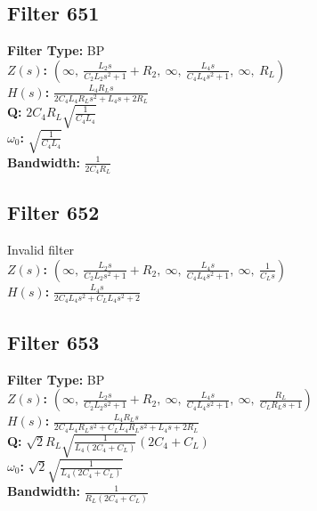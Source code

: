 \documentclass{article}
\begin{document}
\subsection*{Filter 651}
\textbf{Filter Type:} BP \\ 
\textbf{$Z(s)$:} $\left( \infty, \  \frac{L_{2} s}{C_{2} L_{2} s^{2} + 1} + R_{2}, \  \infty, \  \frac{L_{4} s}{C_{4} L_{4} s^{2} + 1}, \  \infty, \  R_{L}\right)$ \\ 
\textbf{$H(s)$:} $\frac{L_{4} R_{L} s}{2 C_{4} L_{4} R_{L} s^{2} + L_{4} s + 2 R_{L}}$ \\ 
\textbf{Q:} $2 C_{4} R_{L} \sqrt{\frac{1}{C_{4} L_{4}}}$ \\ 
\textbf{$\omega_0$:} $\sqrt{\frac{1}{C_{4} L_{4}}}$ \\ 
\textbf{Bandwidth:} $\frac{1}{2 C_{4} R_{L}}$ \\ 
\subsection*{Filter 652}
Invalid filter \\ 
\textbf{$Z(s)$:} $\left( \infty, \  \frac{L_{2} s}{C_{2} L_{2} s^{2} + 1} + R_{2}, \  \infty, \  \frac{L_{4} s}{C_{4} L_{4} s^{2} + 1}, \  \infty, \  \frac{1}{C_{L} s}\right)$ \\ 
\textbf{$H(s)$:} $\frac{L_{4} s}{2 C_{4} L_{4} s^{2} + C_{L} L_{4} s^{2} + 2}$ \\ 
\subsection*{Filter 653}
\textbf{Filter Type:} BP \\ 
\textbf{$Z(s)$:} $\left( \infty, \  \frac{L_{2} s}{C_{2} L_{2} s^{2} + 1} + R_{2}, \  \infty, \  \frac{L_{4} s}{C_{4} L_{4} s^{2} + 1}, \  \infty, \  \frac{R_{L}}{C_{L} R_{L} s + 1}\right)$ \\ 
\textbf{$H(s)$:} $\frac{L_{4} R_{L} s}{2 C_{4} L_{4} R_{L} s^{2} + C_{L} L_{4} R_{L} s^{2} + L_{4} s + 2 R_{L}}$ \\ 
\textbf{Q:} $\sqrt{2} R_{L} \sqrt{\frac{1}{L_{4} \left(2 C_{4} + C_{L}\right)}} \left(2 C_{4} + C_{L}\right)$ \\ 
\textbf{$\omega_0$:} $\sqrt{2} \sqrt{\frac{1}{L_{4} \left(2 C_{4} + C_{L}\right)}}$ \\ 
\textbf{Bandwidth:} $\frac{1}{R_{L} \left(2 C_{4} + C_{L}\right)}$ \\ 
\end{document}
